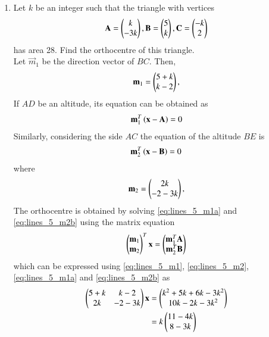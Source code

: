 \documentclass[journal,12pt,twocolumn]{IEEEtran}
\begin{document}
\begin{enumerate}[label=\arabic*]
\item Let $k$ be an integer such that the triangle with vertices
\begin{equation}
\label{eq:lines_5}
\mathbf{A} = \begin{pmatrix}k\\-3k\end{pmatrix},
\mathbf{B} =\begin{pmatrix}5\\k\end{pmatrix},
\mathbf{C} =\begin{pmatrix}-k\\2\end{pmatrix}
\end{equation}
has area 28.  Find the orthocentre of this triangle.
%
\\
\solution Let $\vec{m}_1$ be the direction vector of $BC$.  Then,
\begin{align}
\label{eq:lines_5_m1}
\mathbf{m}_1 = \begin{pmatrix}5+k\\k-2\end{pmatrix},
\end{align}
%
If $AD$ be an altitude, its equation can be obtained as
\begin{align}
\label{eq:lines_5_m1a}
\mathbf{m}_1^{T}\left(\mathbf{x}-\mathbf{A}\right) = 0
\end{align}
%
Similarly, considering the side $AC$  the equation of the altitude $BE$ is
\begin{align}
\label{eq:lines_5_m2b}
\mathbf{m}_2^{T}\left(\mathbf{x}-\mathbf{B}\right) = 0
\end{align}
%
where 
\begin{align}
\label{eq:lines_5_m2}
\mathbf{m}_2 = \begin{pmatrix}2k\\-2-3k\end{pmatrix},
\end{align}
The orthocentre is obtained by solving \eqref{eq:lines_5_m1a}
and \eqref{eq:lines_5_m2b} using the matrix equation
\begin{align}
\begin{pmatrix}\mathbf{m}_1\\ \mathbf{m}_2\end{pmatrix}^T \mathbf{x} 
= \begin{pmatrix} \mathbf{m}_1^T\mathbf{A}\\ \mathbf{m}_2^T
\mathbf{B}\end{pmatrix}
\end{align}
%
which can be expressed using \eqref{eq:lines_5_m1}, 
\eqref{eq:lines_5_m2}, 
\eqref{eq:lines_5_m1a} and 
\eqref{eq:lines_5_m2b}
as 
\begin{align}
\begin{pmatrix}5+k & k-2 \\2k & -2-3k\end{pmatrix} \mathbf{x} 
&= \begin{pmatrix} k^2+5k+6k-3k^2\\ 10k-2k-3k^2\end{pmatrix}
\nonumber \\
&= k\begin{pmatrix} 11-4k\\ 8-3k\end{pmatrix}
\label{eq:lines_5_h}
\end{align}
%

\end{enumerate}
\end{document}
